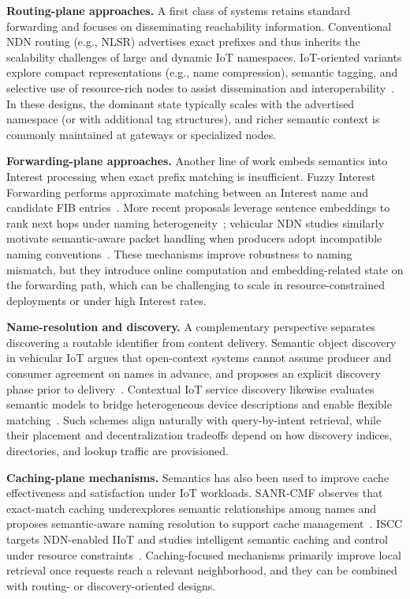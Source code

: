 \documentclass[journal]{IEEEtran}
\begin{document}
\textbf{Routing-plane approaches.}
A first class of systems retains standard forwarding and focuses on disseminating reachability information.
Conventional NDN routing (e.g., NLSR) advertises exact prefixes and thus inherits the scalability challenges of large and dynamic IoT namespaces.
IoT-oriented variants explore compact representations (e.g., name compression), semantic tagging, and selective use of resource-rich nodes to assist dissemination and interoperability~\cite{inf_ndn_iot}.
In these designs, the dominant state typically scales with the advertised namespace (or with additional tag structures), and richer semantic context is commonly maintained at gateways or specialized nodes.

\textbf{Forwarding-plane approaches.}
Another line of work embeds semantics into Interest processing when exact prefix matching is insufficient.
Fuzzy Interest Forwarding performs approximate matching between an Interest name and candidate FIB entries~\cite{fuzzy_forwarding}.
More recent proposals leverage sentence embeddings to rank next hops under naming heterogeneity~\cite{amadeo2025saf}; vehicular NDN studies similarly motivate semantic-aware packet handling when producers adopt incompatible naming conventions~\cite{dt_vndn_semantic}.
These mechanisms improve robustness to naming mismatch, but they introduce online computation and embedding-related state on the forwarding path, which can be challenging to scale in resource-constrained deployments or under high Interest rates.

\textbf{Name-resolution and discovery.}
A complementary perspective separates discovering a routable identifier from content delivery.
Semantic object discovery in vehicular IoT argues that open-context systems cannot assume producer and consumer agreement on names in advance, and proposes an explicit discovery phase prior to delivery~\cite{grewe2018sodi}.
Contextual IoT service discovery likewise evaluates semantic models to bridge heterogeneous device descriptions and enable flexible matching~\cite{antunes2022context}.
Such schemes align naturally with query-by-intent retrieval, while their placement and decentralization tradeoffs depend on how discovery indices, directories, and lookup traffic are provisioned.

\textbf{Caching-plane mechanisms.}
Semantics has also been used to improve cache effectiveness and satisfaction under IoT workloads.
SANR-CMF observes that exact-match caching underexplores semantic relationships among names and proposes semantic-aware naming resolution to support cache management~\cite{sanr_cmf}.
ISCC targets NDN-enabled IIoT and studies intelligent semantic caching and control under resource constraints~\cite{iscc}.
Caching-focused mechanisms primarily improve local retrieval once requests reach a relevant neighborhood, and they can be combined with routing- or discovery-oriented designs.
\end{document}
